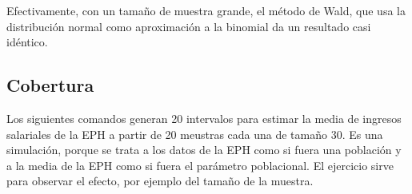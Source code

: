 \documentclass[]{book}
\begin{document}
Efectivamente, con un tamaño de muestra grande, el método de Wald, que usa la distribución normal como aproximación a la binomial da un resultado casi idéntico.

\hypertarget{cobertura}{%
\subsection{Cobertura}\label{cobertura}}

Los siguientes comandos generan 20 intervalos para estimar la media de ingresos salariales de la EPH a partir de 20 meustras cada una de tamaño 30. Es una simulación, porque se trata a los datos de la EPH como si fuera una población y a la media de la EPH como si fuera el parámetro poblacional. El ejercicio sirve para observar el efecto, por ejemplo del tamaño de la muestra.
\end{document}
